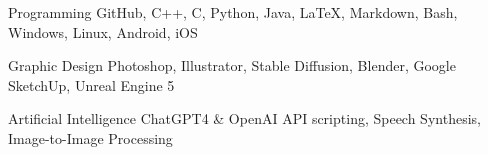 

\begin{cvskills}


  \cvskill
    {Programming} %
    {GitHub, C++, C, Python, Java, LaTeX, Markdown, Bash, Windows, Linux, Android, iOS} %


  \cvskill
    {Graphic Design} %
    {Photoshop, Illustrator, Stable Diffusion, Blender, Google SketchUp, Unreal Engine 5} %


  \cvskill
    {Artificial Intelligence} %
	{ChatGPT4 \& OpenAI API scripting, Speech Synthesis, Image-to-Image Processing} %

\end{cvskills}
